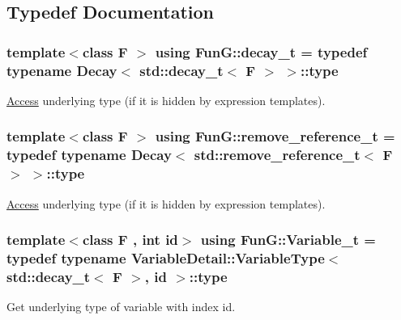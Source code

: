 \subsection{Typedef Documentation}
\subsubsection[{\texorpdfstring{decay\+\_\+t}{decay_t}}]{\setlength{\rightskip}{0pt plus 5cm}template$<$class F $>$ using {\bf Fun\+G\+::decay\+\_\+t} = typedef typename {\bf Decay}$<$ std\+::decay\+\_\+t$<$ F $>$ $>$\+::type}\hypertarget{namespaceFunG_a7ff91644f18a190ac3d4fc9e970ebe2e}{}\label{namespaceFunG_a7ff91644f18a190ac3d4fc9e970ebe2e}


\hyperlink{namespaceFunG_1_1Access}{Access} underlying type (if it is hidden by expression templates). 

\subsubsection[{\texorpdfstring{remove\+\_\+reference\+\_\+t}{remove_reference_t}}]{\setlength{\rightskip}{0pt plus 5cm}template$<$class F $>$ using {\bf Fun\+G\+::remove\+\_\+reference\+\_\+t} = typedef typename {\bf Decay}$<$ std\+::remove\+\_\+reference\+\_\+t$<$ F $>$ $>$\+::type}\hypertarget{namespaceFunG_a40f6d0896c1e3837d442d39418a4f609}{}\label{namespaceFunG_a40f6d0896c1e3837d442d39418a4f609}


\hyperlink{namespaceFunG_1_1Access}{Access} underlying type (if it is hidden by expression templates). 

\subsubsection[{\texorpdfstring{Variable\+\_\+t}{Variable_t}}]{\setlength{\rightskip}{0pt plus 5cm}template$<$class F , int id$>$ using {\bf Fun\+G\+::\+Variable\+\_\+t} = typedef typename Variable\+Detail\+::\+Variable\+Type$<$ std\+::decay\+\_\+t$<$ F $>$, id $>$\+::type}\hypertarget{namespaceFunG_a1c6fc5c4c7cd6678b9de8962c14b86b5}{}\label{namespaceFunG_a1c6fc5c4c7cd6678b9de8962c14b86b5}


Get underlying type of variable with index id. 

